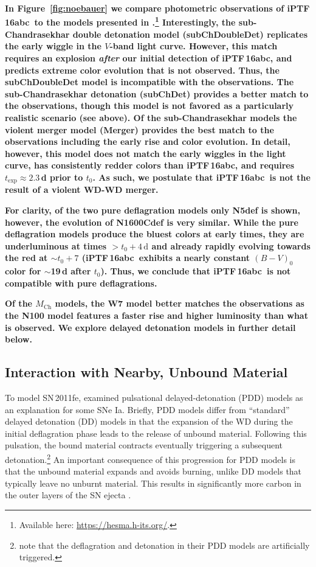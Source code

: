 \documentclass[twocolumn]{aastex61}
\newcommand{\abc}{iPTF\,16abc}
\begin{document}
\textbf{In Figure~\ref{fig:noebauer} we compare photometric observations of
\abc\ to the models presented in
\citet{2017MNRAS.472.2787N}.\footnote{Available here:
\url{https://hesma.h-its.org/}.} Interestingly, the sub-Chandrasekhar double
detonation model (subChDoubleDet) replicates the early wiggle in the $V$-band
light curve. However, this match requires an explosion \textit{after} our
initial detection of \abc, and predicts extreme color evolution that is not
observed. Thus, the subChDoubleDet model is incompatible with the
observations. The sub-Chandrasekhar detonation (subChDet) provides a better
match to the observations, though this model is not favored as a particularly
realistic scenario (see above). Of the sub-Chandrasekhar models the violent
merger model (Merger) provides the best match to the observations including
the early rise and color evolution. In detail, however, this model does not
match the early wiggles in the light curve, has consistently redder colors
than \abc, and requires $t_\mathrm{exp} \approx 2.3$\,d prior to $t_0$. As
such, we postulate that \abc\ is not the result of a violent WD-WD merger.}

\textbf{For clarity, of the two pure deflagration models only N5def is shown,
however, the evolution of N1600Cdef is very similar. While the pure
deflagration models produce the bluest colors at early times, they are
underluminous at times $> t_0 + 4\,\mathrm{d}$ and already rapidly evolving
towards the red at $\sim$$t_0 + 7$ (\abc\ exhibits a nearly constant $(B-V)_0$
color for $\sim$19\,d after $t_0$). Thus, we conclude that \abc\ is not
compatible with pure deflagrations.}

\textbf{Of the $M_\mathrm{Ch}$ models, the W7 model better matches the
observations as the N100 model features a faster rise and higher luminosity
than what is observed. We explore delayed detonation models in further detail
below.}

\subsection{Interaction with \textbf{Nearby, Unbound} Material}

To model SN\,2011fe, \citet{2014MNRAS.441..532D} examined
pulsational delayed-detonation (PDD) models as an explanation for some SNe
Ia. Briefly, PDD models differ from ``standard'' delayed detonation (DD)
models in that the expansion of the WD during the initial deflagration
phase leads to the release of unbound material. Following this pulsation,
the bound material contracts eventually triggering a subsequent
detonation.\footnote{\citet{2014MNRAS.441..532D} note that the deflagration
and detonation in their PDD models are artificially triggered.} An
important consequence of this progression for PDD models is that the
unbound material expands and avoids burning, unlike DD models that
typically leave no unburnt material. This results in significantly more
carbon in the outer layers of the SN ejecta \citep{2014MNRAS.441..532D}.
\end{document}
